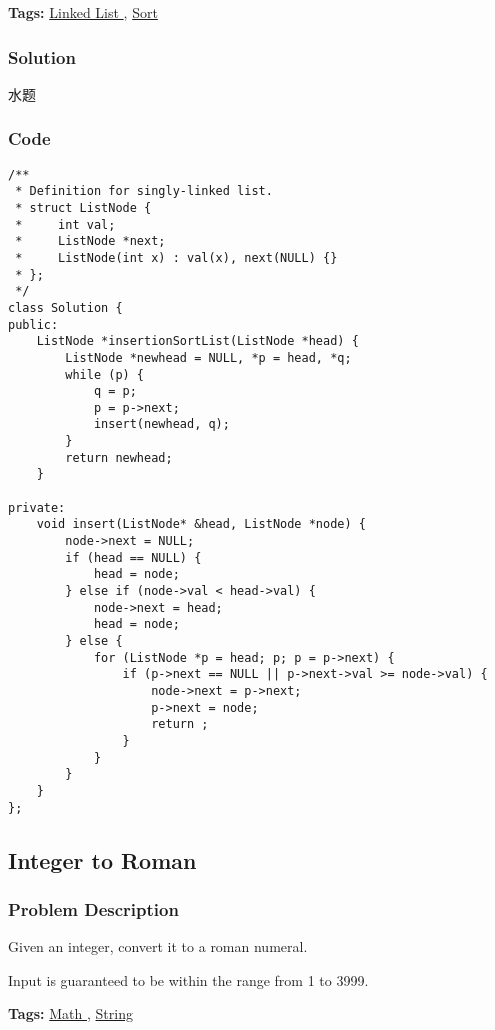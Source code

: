 \documentclass{article}
\begin{document}
\begin{CJK*}{UTF8}{gkai}
\textbf{Tags: }
\hyperref[ Linked List ]{ Linked List },  \hyperref[ Sort ]{ Sort }



\subsubsection*{Solution}
水题

\subsubsection*{Code}
\begin{lstlisting}
/**
 * Definition for singly-linked list.
 * struct ListNode {
 *     int val;
 *     ListNode *next;
 *     ListNode(int x) : val(x), next(NULL) {}
 * };
 */
class Solution {
public:
    ListNode *insertionSortList(ListNode *head) {
        ListNode *newhead = NULL, *p = head, *q;
        while (p) {
            q = p;
            p = p->next;
            insert(newhead, q);
        }
        return newhead;
    }
    
private:
    void insert(ListNode* &head, ListNode *node) {
        node->next = NULL;
        if (head == NULL) {
            head = node;
        } else if (node->val < head->val) {
            node->next = head;
            head = node;
        } else {
            for (ListNode *p = head; p; p = p->next) {
                if (p->next == NULL || p->next->val >= node->val) {
                    node->next = p->next;
                    p->next = node;
                    return ;
                }
            }
        }
    }
}; 
\end{lstlisting}


\subsection{ Integer to Roman }
\label{ Integer to Roman }

\subsubsection*{Problem Description}
Given an integer, convert it to a roman numeral.

Input is guaranteed to be within the range from 1 to 3999.


\textbf{Tags: }
\hyperref[ Math ]{ Math },  \hyperref[ String ]{ String }




\end{CJK*}
\end{document}
